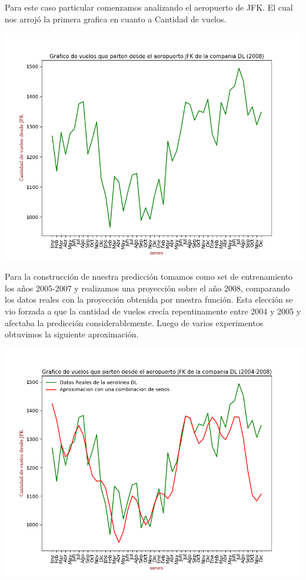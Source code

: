 \documentclass{endm}
\begin{document}
Para este caso particular comenzamos analizando el aeropuerto de JFK. El cual nos arrojó la primera grafica en cuanto a Cantidad de vuelos.

\begin{center}
\includegraphics[scale=0.4]{imagenes/nuevas/vuelosDLJFK.png}
\end{center}

Para la construcción de nuestra predicción tomamos como set de entrenamiento los a\~nos 2005-2007 y realizamos una proyección sobre el año 2008, comparando los datos reales con la proyección obtenida por nuestra función. Esta elección se vio forzada a que la cantidad de vuelos crecía repentinamente entre 2004 y 2005 y afectaba la predicción considerablemente.
Luego de varios experimentos obtuvimos la siguiente aproximación.

\begin{center}
\includegraphics[scale=0.6]{imagenes/nuevas/DLCantSeno.png}
\end{center}
\end{document}
